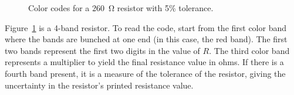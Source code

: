 \documentclass[addpoints]{physlabs}
\begin{document}
\begin{labsection}
\begin{experiment}
\begin{figure}[ht]
    \centering
    
    \caption{Color codes for a \qty{260}{\ohm} resistor with 5\% tolerance.}
    \label{fig: resistor color code}
\end{figure}

Figure~\ref{fig: resistor color code} is a 4-band resistor. To read the code, start from the first color band where the bands are bunched at one end (in this case, the red band). The first two bands represent the first two digits in the value of $R$. The third color band represents a multiplier to yield the final resistance value in ohms. If there is a fourth band present, it is a measure of the tolerance of the resistor, giving the uncertainty in the resistor's printed resistance value.


\end{experiment}
\end{labsection}
\end{document}
